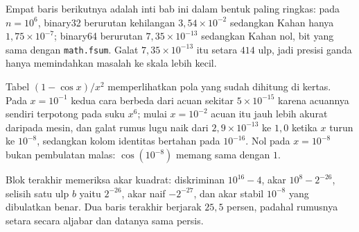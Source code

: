 Empat baris berikutnya adalah inti bab ini dalam bentuk paling ringkas: pada
$n=10^{6}$, binary32 berurutan kehilangan $3{,}54\times10^{-2}$ sedangkan Kahan hanya
$1{,}75\times10^{-7}$; binary64 berurutan $7{,}35\times10^{-13}$ sedangkan Kahan nol,
bit yang sama dengan \texttt{math.fsum}. Galat $7{,}35\times10^{-13}$ itu setara
$414$ ulp, jadi presisi ganda hanya memindahkan masalah ke skala lebih kecil.

Tabel $(1-\cos x)/x^{2}$ memperlihatkan pola yang sudah dihitung di kertas. Pada
$x=10^{-1}$ kedua cara berbeda dari acuan sekitar $5\times10^{-15}$ karena acuannya
sendiri terpotong pada suku $x^{6}$; mulai $x=10^{-2}$ acuan itu jauh lebih akurat
daripada mesin, dan galat rumus lugu naik dari $2{,}9\times10^{-13}$ ke $1{,}0$
ketika $x$ turun ke $10^{-8}$, sedangkan kolom identitas bertahan pada $10^{-16}$.
Nol pada $x=10^{-8}$ bukan pembulatan malas: $\cos(10^{-8})$ memang sama dengan $1$.

Blok terakhir memeriksa akar kuadrat: diskriminan $10^{16}-4$, akar $10^{8}-2^{-26}$,
selisih satu ulp $b$ yaitu $2^{-26}$, akar naif $-2^{-27}$, dan akar stabil $10^{-8}$
yang dibulatkan benar. Dua baris
terakhir berjarak $25{,}5$ persen, padahal rumusnya setara secara aljabar dan datanya
sama persis.


